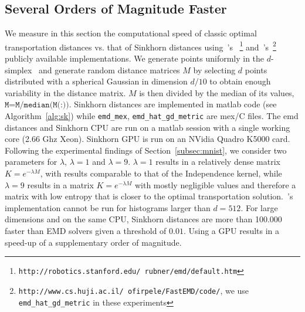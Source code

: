 \documentclass{amsart} %
\begin{document}
\subsection{Several Orders of Magnitude Faster}\label{subsec:computational}
We measure in this section the computational speed of classic optimal transportation distances vs. that of Sinkhorn distances using~\citeauthor{rubner1997earth}'s ~\citeyearpar{rubner1997earth}\footnote{\texttt{http://robotics.stanford.edu/~rubner/emd/default.htm}} and~\citeauthor{Pele-iccv2009}'s~\citeyearpar{Pele-iccv2009}\footnote{\texttt{http://www.cs.huji.ac.il/~ofirpele/FastEMD/code/}, we use \texttt{emd\_hat\_gd\_metric} in these experiments} publicly available implementations. 
We generate points uniformly in the $d$-simplex~\citep{smith2004sampling} and generate random distance matrices $M$ by selecting $d$ points distributed with a spherical Gaussian in dimension $d/10$ to obtain enough variability in the distance matrix. $M$ is then divided by the median of its values, $\texttt{M=M/median(M(:))}$. Sinkhorn distances are implemented in matlab code (see Algorithm~\ref{alg:sk}) while 
\texttt{emd\_mex}, \texttt{emd\_hat\_gd\_metric} are mex/C files. 
The emd distances and Sinkhorn CPU are run on a matlab session with a single working core (2.66 Ghz Xeon). Sinkhorn GPU is run on an NVidia Quadro K5000 card. Following the experimental findings of Section~\ref{subsec:mnist}, we consider two parameters for $\lambda$, $\lambda=1$ and $\lambda=9$. $\lambda=1$ results in a relatively dense matrix $K=e^{-\lambda M}$, with results comparable to that of the Independence kernel, while $\lambda=9$ results in a matrix $K=e^{-\lambda M}$ with mostly negligible values and therefore a matrix with low entropy that is closer to the optimal transportation solution.~\citeauthor{rubner1997earth}'s implementation cannot be run for histograms larger than $d=512$. For large dimensions and on the same CPU, Sinkhorn distances are more than 100.000 faster than EMD solvers given a threshold of $0.01$. Using a GPU results in a speed-up of a supplementary order of magnitude.


\end{document}
